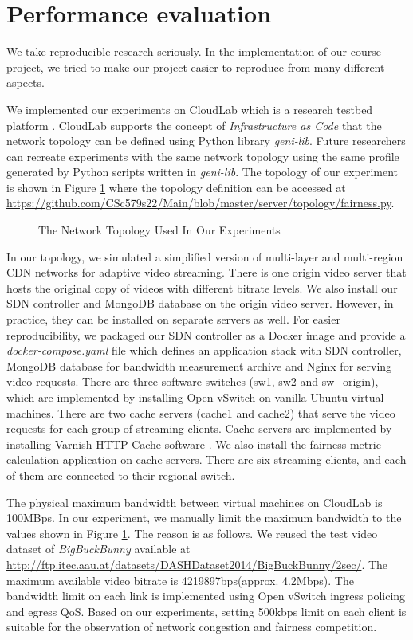 \documentclass[12pt]{article}
\begin{document}
\section{Performance evaluation}

We take reproducible research seriously. In the implementation of our course project, we tried to make our project easier to reproduce from many different aspects.

We implemented our experiments on CloudLab which is a research testbed platform \cite{Ricci2014IntroducingCS}. CloudLab supports the concept of \textit{Infrastructure as Code} that the network topology can be defined using Python library \textit{geni-lib}. Future researchers can recreate experiments with the same network topology using the same profile generated by Python scripts written in \textit{geni-lib}. The topology of our experiment is shown in Figure \ref{fig:ourarch} where the topology definition can be accessed at \url{https://github.com/CSc579s22/Main/blob/master/server/topology/fairness.py}.

\begin{figure}[H]
\centering

\caption{The Network Topology Used In Our Experiments}
\label{fig:ourarch}
\end{figure}

In our topology, we simulated a simplified version of multi-layer and multi-region CDN networks for adaptive video streaming. There is one origin video server that hosts the original copy of videos with different bitrate levels. We also install our SDN controller and MongoDB database on the origin video server. However, in practice, they can be installed on separate servers as well. For easier reproducibility, we packaged our SDN controller as a Docker image and provide a \textit{docker-compose.yaml} file which defines an application stack with SDN controller, MongoDB database for bandwidth measurement archive and Nginx for serving video requests. There are three software switches (sw1, sw2 and sw\_origin), which are implemented by installing Open vSwitch on vanilla Ubuntu virtual machines. There are two cache servers (cache1 and cache2) that serve the video requests for each group of streaming clients. Cache servers are implemented by installing Varnish HTTP Cache software \cite{varnish}. We also install the fairness metric calculation application on cache servers. There are six streaming clients, and each of them are connected to their regional switch.

The physical maximum bandwidth between virtual machines on CloudLab is 100MBps. In our experiment, we manually limit the maximum bandwidth to the values shown in Figure \ref{fig:ourarch}. The reason is as follows. We reused the test video dataset of \textit{BigBuckBunny} available at \url{http://ftp.itec.aau.at/datasets/DASHDataset2014/BigBuckBunny/2sec/}. The maximum available video bitrate is 4219897bps(approx. 4.2Mbps). The bandwidth limit on each link is implemented using Open vSwitch ingress policing and egress QoS. Based on our experiments, setting 500kbps limit on each client is suitable for the observation of network congestion and fairness competition. 
\end{document}

